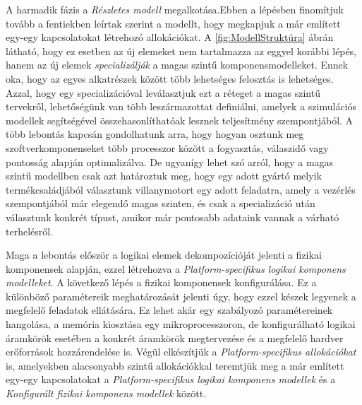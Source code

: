         A harmadik fázis a \emph{Részletes modell} megalkotása.Ebben a lépésben finomítjuk tovább a fentiekben leírtak szerint a modellt, hogy megkapjuk a már említett egy-egy kapcsolatokat létrehozó allokációkat.
        A \ref{fig:ModellStruktúra} ábrán látható, hogy ez esetben az új elemeket nem tartalmazza az eggyel korábbi lépés, hanem az új elemek \emph{specializálják} a magas szintű komponensmodelleket.
        Ennek oka, hogy az egyes alkatrészek között több lehetséges felosztás is lehetséges. Azzal, hogy egy specializációval leválasztjuk ezt a réteget a magas szintű tervekről, lehetőségünk van több leszármazottat definiálni, amelyek a szimulációs modellek segítségével összehasonlíthatóak lesznek teljesítmény szempontjából.
        A több lebontás kapcsán gondolhatunk arra, hogy hogyan osztunk meg szoftverkomponenseket több processzor között a fogyasztás, válaszidő vagy pontosság alapján optimalizálva. De ugyanígy lehet szó arról, hogy a magas szintű modellben csak azt határoztuk meg, hogy egy adott gyártó melyik termékcsaládjából választunk villanymotort egy adott feladatra, amely a vezérlés szempontjából már elegendő magas szinten, és csak a specializáció után választunk konkrét típust, amikor már pontosabb adataink vannak a várható terhelésről.

        Maga a lebontás először a logikai elemek dekompozícióját jelenti a fizikai komponensek alapján, ezzel létrehozva a \emph{Platform-specifikus logikai komponens modelleket}.
        A következő lépés a fizikai komponensek konfigurálása. Ez a különböző paramétereik meghatározását jelenti úgy, hogy ezzel készek legyenek a megfelelő feladatok ellátására.
        Ez lehet akár egy szabályozó paramétereinek hangolása, a memória kiosztása egy mikroprocesszoron, de konfigurálható logikai áramkörök esetében a konkrét áramkörök megtervezése és a megfelelő hardver erőforrások hozzárendelése is.
        Végül elkészítjük a \emph{Platform-specifikus allokációkat} is, amelyekben alacsonyabb szintű allokációkkal teremtjük meg a már említett egy-egy kapcsolatokat a \emph{Platform-specifikus logikai komponens modellek} és a \emph{Konfigurált fizikai komponens modellek} között.

